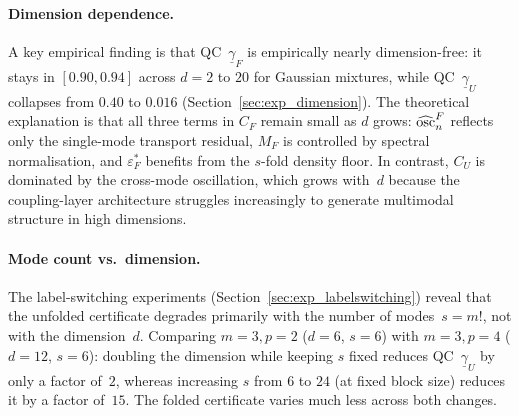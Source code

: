 \paragraph{Dimension dependence.}
A key empirical finding is that
QC~$\underline{\gamma}_F$ is empirically nearly dimension-free:
it stays in $[0.90, 0.94]$ across $d = 2$ to $20$ for Gaussian
mixtures, while QC~$\underline{\gamma}_U$ collapses from $0.40$
to $0.016$ (Section~\ref{sec:exp_dimension}).  The theoretical
explanation is that all three terms in $C_F$ remain small as $d$
grows: $\widehat{\mathrm{osc}}_n^F$ reflects only the single-mode
transport residual, $M_F$ is controlled by spectral normalisation,
and $\varepsilon_F^*$ benefits from the $s$-fold density floor.
In contrast, $C_U$ is dominated by the cross-mode oscillation,
which grows with~$d$ because the coupling-layer architecture
struggles increasingly to generate multimodal structure in high
dimensions.

\paragraph{Mode count vs.\ dimension.}
The label-switching experiments (Section~\ref{sec:exp_labelswitching})
reveal that the unfolded certificate degrades primarily with the
number of modes~$s = m!$, not with the dimension~$d$.
Comparing $m = 3, p = 2$ ($d = 6$, $s = 6$) with $m = 3, p = 4$
($d = 12$, $s = 6$): doubling the dimension while keeping $s$
fixed reduces QC~$\underline{\gamma}_U$ by only a factor of~$2$,
whereas increasing $s$ from $6$ to $24$ (at fixed block size)
reduces it by a factor of~$15$.  The folded certificate varies
much less across both changes.
